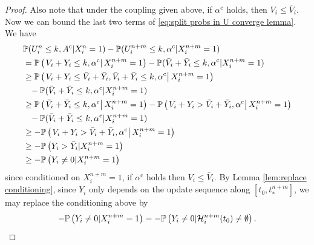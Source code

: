 \begin{proof}
		Also note that under the coupling given above, if $\alpha^\mathrm{c}$ holds, then $V_i \leq \bar{V}_i$. Now we can bound the last two terms of \eqref{eq:split probs in U converge lemma}. We have
		\begin{align}
			&\mathbb{P}(U_i^n \leq k, A^\mathrm{c} | X_i^n = 1) - \mathbb{P}(U_i^{n+m} \leq k, \alpha^\mathrm{c} | X_i^{n+m} = 1) \notag\\
			&= \mathbb{P}\left(\left. V_i + Y_i \leq k, \alpha^\mathrm{c} \right| X_i^{n+m} = 1 \right) - \mathbb{P}(\bar{V}_i + \bar{Y}_i \leq k, \alpha^\mathrm{c} | X_i^{n+m} = 1)\\
			&\geq \mathbb{P}\left(\left. V_i + Y_i \leq \bar{V}_i + \bar{Y}_i, \bar{V}_i + \bar{Y}_i \leq k, \alpha^\mathrm{c} \right| X_i^{n+m} = 1 \right) \notag \\
			&\phantom{=} - \mathbb{P}(\bar{V}_i + \bar{Y}_i \leq k, \alpha^\mathrm{c} | X_i^{n+m} = 1)\\
			&\geq \mathbb{P}\left(\left. \bar{V}_i + \bar{Y}_i \leq k, \alpha^\mathrm{c} \right| X_i^{n+m} = 1 \right) -\mathbb{P}\left(\left. V_i + Y_i > \bar{V}_i + \bar{Y}_i, \alpha^\mathrm{c} \right| X_i^{n+m} = 1 \right) \notag \\
			&\phantom{=} - \mathbb{P}(\bar{V}_i + \bar{Y}_i \leq k, \alpha^\mathrm{c} | X_i^{n+m} = 1)\\
			&\geq -\mathbb{P}\left(\left. V_i + Y_i > \bar{V}_i + \bar{Y}_i, \alpha^\mathrm{c} \right| X_i^{n+m} = 1 \right)\\
			&\geq -\mathbb{P}\left(Y_i > \bar{Y}_i | X_i^{n+m} = 1 \right)\\
			&\geq -\mathbb{P}\left(Y_i \neq 0 | X_i^{n+m} = 1 \right)
		\end{align}
		since conditioned on $X_i^{n+m} = 1$, if $\alpha^\mathrm{c}$ holds then $V_i \leq \bar{V}_i$. By Lemma \ref{lem:replace conditioning}, since $Y_i$ only depends on the update sequence along $[t_0, t_*^{n+m}]$, we may replace the conditioning above by
		\begin{align}
			-\mathbb{P}\left(Y_i \neq 0 | X_i^{n+m} = 1 \right) = -\mathbb{P}\left(Y_i \neq 0 | \mathcal{H}_i^{n+m}(t_0) \neq \emptyset \right).
		\end{align}


\end{proof}
